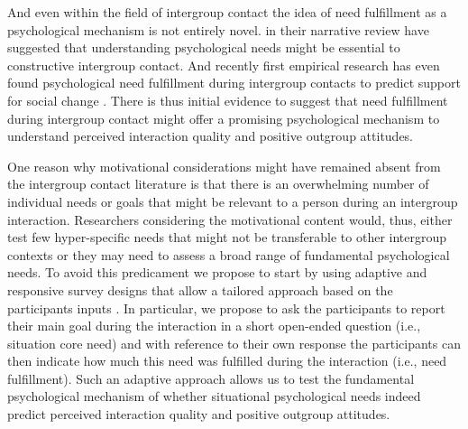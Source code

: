 \documentclass[man, 12pt, a4paper]{apa7}
\theoremstyle{break}
\theoremstyle{plain}
\begin{document}
And even within the field of intergroup contact the idea of need fulfillment as a psychological mechanism is not entirely novel. \citet{Dovidio2017} in their narrative review have suggested that understanding psychological needs might be essential to constructive intergroup contact. And recently first empirical research has even found psychological need fulfillment during intergroup contacts to predict support for social change \citep[][]{Hassler2021}. There is thus initial evidence to suggest that need fulfillment during intergroup contact might offer a promising psychological mechanism to understand perceived interaction quality and positive outgroup attitudes. 

One reason why motivational considerations might have remained absent from the intergroup contact literature is that there is an overwhelming number of individual needs or goals that might be relevant to a person during an intergroup interaction. Researchers considering the motivational content would, thus, either test few hyper-specific needs that might not be transferable to other intergroup contexts or they may need to assess a broad range of fundamental psychological needs. To avoid this predicament we propose to start by using adaptive and responsive survey designs that allow a tailored approach based on the participants inputs \citep[e.g.,][]{Tourangeau2017}. In particular, we propose to ask the participants to report their main goal during the interaction in a short open-ended question (i.e., situation core need) and with reference to their own response the participants can then indicate how much this need was fulfilled during the interaction (i.e., need fulfillment). Such an adaptive approach allows us to test the fundamental psychological mechanism of whether situational psychological needs indeed predict perceived interaction quality and positive outgroup attitudes. 
\end{document}
